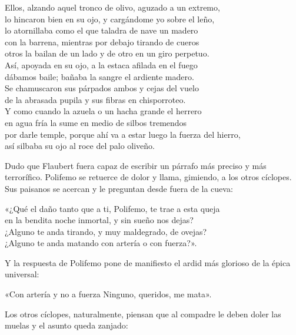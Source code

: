 \begin{versocita}
Ellos, alzando aquel tronco de olivo, aguzado a un extremo,\\
lo hincaron bien en su ojo, y cargándome yo sobre el leño,\\
lo atornillaba como el que taladra de nave un madero\\
con la barrena, mientras por debajo tirando de cueros\\
otros la bailan de un lado y de otro en un giro perpetuo.\\
Así, apoyada en su ojo, a la estaca afilada en el fuego\\
dábamos baile; bañaba la sangre el ardiente madero.\\
Se chamuscaron sus párpados ambos y cejas del vuelo\\
de la abrasada pupila y sus fibras en chisporroteo.\\
Y como cuando la azuela o un hacha grande el herrero\\
en agua fría la sume en medio de silbos tremendos\\
por darle temple, porque ahí va a estar luego la fuerza del hierro,\\
así silbaba su ojo al roce del palo oliveño.
\end{versocita}

Dudo que Flaubert fuera capaz de escribir un párrafo más preciso y más terrorífico. Polifemo se retuerce de dolor y llama, gimiendo, a los otros cíclopes. Sus paisanos se acercan y le preguntan desde fuera de la cueva:

\begin{versocita}
«¿Qué el daño tanto que a ti, Polifemo, te trae a esta queja\\
en la bendita noche inmortal, y sin sueño nos dejas?\\
¿Alguno te anda tirando, y muy maldegrado, de ovejas?\\
¿Alguno te anda matando con artería o con fuerza?».
\end{versocita}

Y la respuesta de Polifemo pone de manifiesto el ardid más glorioso de la épica universal:

\begin{versocita}
«Con artería y no a fuerza Ninguno, queridos, me mata».
\end{versocita}

Los otros cíclopes, naturalmente, piensan que al compadre le deben doler las muelas y el asunto queda zanjado:

